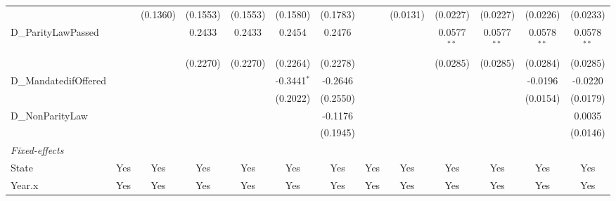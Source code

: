 \begin{tabular}{lcccccccccccc}
                         &                & (0.1360)       & (0.1553)        & (0.1553)        & (0.1580)        & (0.1783)        &                         & (0.0131)                & (0.0227)               & (0.0227)               & (0.0226)                & (0.0233)\\   
   D\_ParityLawPassed    &                &                & 0.2433          & 0.2433          & 0.2454          & 0.2476          &                         &                         & 0.0577$^{**}$          & 0.0577$^{**}$          & 0.0578$^{**}$           & 0.0578$^{**}$\\   
                         &                &                & (0.2270)        & (0.2270)        & (0.2264)        & (0.2278)        &                         &                         & (0.0285)               & (0.0285)               & (0.0284)                & (0.0285)\\   
   D\_MandatedifOffered  &                &                &                 &                 & -0.3441$^{*}$   & -0.2646         &                         &                         &                        &                        & -0.0196                 & -0.0220\\   
                         &                &                &                 &                 & (0.2022)        & (0.2550)        &                         &                         &                        &                        & (0.0154)                & (0.0179)\\   
   D\_NonParityLaw       &                &                &                 &                 &                 & -0.1176         &                         &                         &                        &                        &                         & 0.0035\\   
                         &                &                &                 &                 &                 & (0.1945)        &                         &                         &                        &                        &                         & (0.0146)\\   
   \midrule
   \emph{Fixed-effects}\\
   State                 & Yes            & Yes            & Yes             & Yes             & Yes             & Yes             & Yes                     & Yes                     & Yes                    & Yes                    & Yes                     & Yes\\  
   Year.x                & Yes            & Yes            & Yes             & Yes             & Yes             & Yes             & Yes                     & Yes                     & Yes                    & Yes                    & Yes                     & Yes\\  

\end{tabular}

